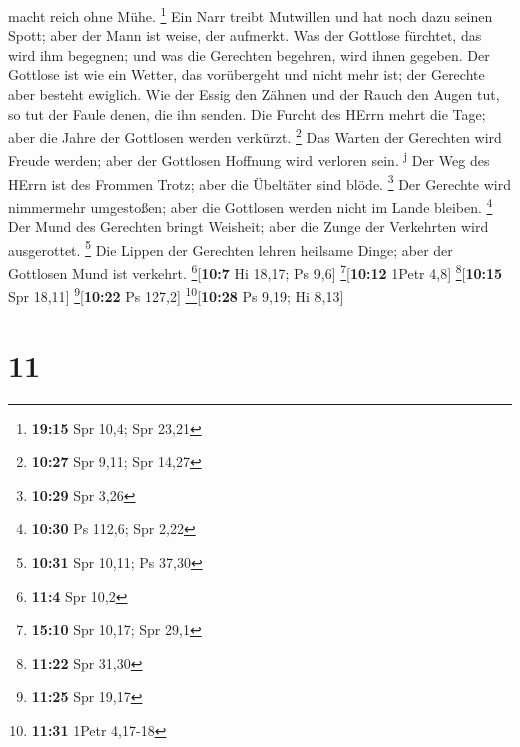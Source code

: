 macht reich ohne Mühe. \footnote{\textbf{19:15} Spr 10,4; Spr 23,21}
 Ein Narr treibt Mutwillen und hat noch dazu seinen
Spott; aber der Mann ist weise, der aufmerkt.  Was der
Gottlose fürchtet, das wird ihm begegnen; und was die Gerechten
begehren, wird ihnen gegeben.  Der Gottlose ist wie ein
Wetter, das vorübergeht und nicht mehr ist; der Gerechte aber besteht
ewiglich.  Wie der Essig den Zähnen und der Rauch den
Augen tut, so tut der Faule denen, die ihn senden.  Die
Furcht des HErrn mehrt die Tage; aber die Jahre der Gottlosen werden
verkürzt. \footnote{\textbf{10:27} Spr 9,11; Spr 14,27} 
Das Warten der Gerechten wird Freude werden; aber der Gottlosen Hoffnung
wird verloren sein. \textsuperscript{j}  Der Weg des
HErrn ist des Frommen Trotz; aber die Übeltäter sind blöde. \footnote{\textbf{10:29}
  Spr 3,26}  Der Gerechte wird nimmermehr umgestoßen;
aber die Gottlosen werden nicht im Lande bleiben. \footnote{\textbf{10:30}
  Ps 112,6; Spr 2,22}  Der Mund des Gerechten bringt
Weisheit; aber die Zunge der Verkehrten wird ausgerottet. \footnote{\textbf{10:31}
  Spr 10,11; Ps 37,30}  Die Lippen der Gerechten lehren
heilsame Dinge; aber der Gottlosen Mund ist verkehrt.
\footnote{\textbf{11:4} Spr 10,2}{[}\textbf{10:7} Hi 18,17; Ps 9,6{]}
\footnote{\textbf{15:10} Spr 10,17; Spr 29,1}{[}\textbf{10:12} 1Petr
4,8{]} \footnote{\textbf{11:22} Spr 31,30}{[}\textbf{10:15} Spr 18,11{]}
\footnote{\textbf{11:25} Spr 19,17}{[}\textbf{10:22} Ps 127,2{]}
\footnote{\textbf{11:31} 1Petr 4,17-18}{[}\textbf{10:28} Ps 9,19; Hi
8,13{]}

\hypertarget{section-10}{%
\section{11}\label{section-10}}

